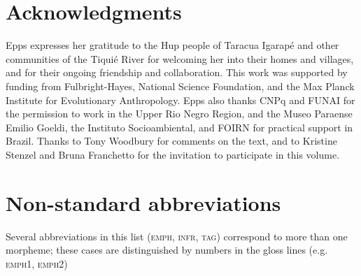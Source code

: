 \documentclass[output=paper,
modfonts,nonflat
]{langsci/langscibook}
\begin{document}
\section*{Acknowledgments}

Epps expresses her gratitude to the Hup people of Taracua Igarapé and other communities of the Tiquié River for welcoming her into their homes and villages, and for their ongoing friendship and collaboration. This work was supported by funding from Fulbright-Hayes, National Science Foundation, and the Max Planck Institute for Evolutionary Anthropology. Epps also thanks CNPq and FUNAI for the permission to work in the Upper Rio Negro Region, and the Museo Paraense Emilio Goeldi, the Instituto Socioambiental, and FOIRN for practical support in Brazil. Thanks to Tony Woodbury for comments on the text, and to Kristine Stenzel and Bruna Franchetto for the invitation to participate in this volume.

\section*{Non-standard abbreviations}
Several abbreviations in this list (\textsc{emph, infr, tag}) correspond to more than one morpheme; these cases are distinguished by numbers in the gloss lines (e.g. \textsc{emph1, emph2})

\medskip\noindent
\end{document}

